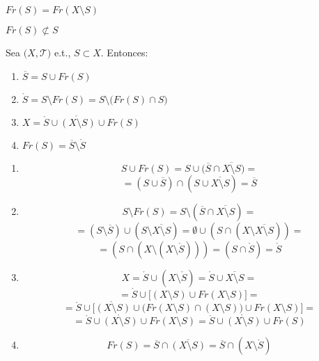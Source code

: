 \begin{obs}
  $ Fr(S) = Fr(X \setminus S)$
\end{obs}

\begin{obs}
  $Fr(S)  \not\subset S$
\end{obs}

\begin{prop}
  Sea $ \big( X, \mathcal{T} \big)$ e.t., $ S \subset X$. Entonces:
  \begin{enumerate}[label=(\roman*)]
    \item $ \overline{S} = S \cup Fr(S)$
    \item $\mathring{S} = S \setminus Fr(S) = S \setminus \big(  Fr(S) \cap S \big)$
    \item $ X = \mathring{S} \cup \mathring{(X \setminus S)} \cup Fr(S)$
    \item $ Fr(S) = \overline{S} \setminus \mathring{S}$
  \end{enumerate}
\end{prop}

\begin{dem}
  \begin{enumerate}[label=(\roman*)]
    \item \[ S \cup Fr(S) =  S \cup \big( \overline{S} \cap \overline{X \setminus S} \big) = \] \[ = (S \cup \overline{S}) \cap (S \cup \overline{X \setminus S}) = \overline{S} \]
    \item \[ S \setminus Fr(S) = S \setminus (\overline{S} \cap \overline{X \setminus S}) = \]
      \[ = (S \setminus \overline{S}) \cup (S \setminus \overline{X \setminus S}) = \emptyset \cup (S \cap (X \setminus \overline{X \setminus S})) = \] 
      \[ = (S \cap (X \setminus (X \setminus \mathring{S}))) = (S \cap \mathring{S})= \mathring{S} \]
    \item \[ X = \mathring{S} \cup (X \setminus \mathring{S}) = \mathring{S} \cup \overline{X \setminus S} = \] 
      \[ = \mathring{S} \cup \big[ (X \setminus S) \cup Fr(X \setminus S) \big] =\] 
      \[ = \mathring{S} \cup \big[ \mathring{(X \setminus S)} \cup \big( Fr(X \setminus S) \cap (X \setminus S) \big) \cup Fr(X \setminus S) \big] = \]
      \[ = \mathring{S} \cup \mathring{(X \setminus S)} \cup Fr(X \setminus S) = \mathring{S} \cup \mathring{(X \setminus S)} \cup Fr(S)  \] 
    \item \[ Fr(S) = \overline{S} \cap \overline{(X \setminus S)} = \overline{S} \cap (X \setminus \mathring{S})\] 
  \end{enumerate}
\end{dem}

